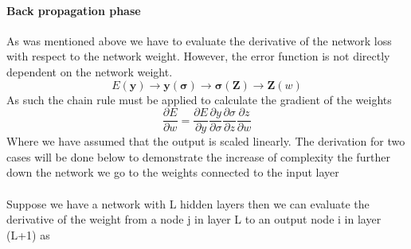 \documentclass[12pt]{article}
\begin{document}
\paragraph{Back propagation phase}

As was mentioned above we have to evaluate the derivative of the network loss with respect to the network weight. However, the error function is not directly dependent on the network weight.
\begin{equation}
	E\left(\textbf{y}\right) \rightarrow \textbf{y}(\bm{\sigma}) \rightarrow \bm{\sigma}(\textbf{Z}) \rightarrow \textbf{Z}(w)
\end{equation}
As such the chain rule must be applied to calculate the gradient of the weights
\begin{equation}
	\frac{\partial E}{\partial w} = \frac{\partial E}{\partial y}\frac{\partial y}{\partial \sigma}\frac{\partial \sigma}{\partial z}\frac{\partial z}{\partial w}
\end{equation}
Where we have assumed that the output is scaled linearly. The derivation for two cases will be done below to demonstrate the increase of complexity the further down the network we go to the weights connected to the input layer
\\
\\
Suppose we have a network with L hidden layers then we can evaluate the derivative of the weight from a node j in layer L to an output node i in layer (L+1) as 
\end{document}
